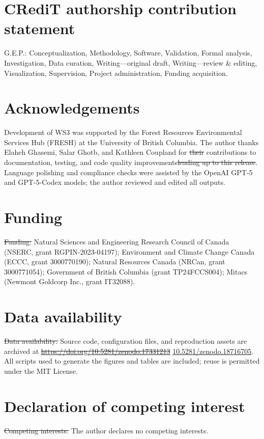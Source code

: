 \documentclass[review]{elsarticle}
\providecommand{\DIFaddtex}[1]{{\protect\color{blue}\uwave{#1}}} %
\providecommand{\DIFdeltex}[1]{{\protect\color{red}\sout{#1}}}                      %
\providecommand{\DIFaddbegin}{} %
\providecommand{\DIFaddend}{} %
\providecommand{\DIFdelbegin}{} %
\providecommand{\DIFdelend}{} %
\providecommand{\DIFadd}[1]{\texorpdfstring{\DIFaddtex{#1}}{#1}} %
\providecommand{\DIFdel}[1]{\texorpdfstring{\DIFdeltex{#1}}{}} %
\newcommand{\DIFscaledelfig}{0.5}
\newlength{\DIFdelgraphicswidth} %
\newlength{\DIFdelgraphicsheight} %
\newcommand{\DIFaddincludegraphics}[2][]{{\color{blue}\fbox{\DIFOincludegraphics[#1]{#2}}}} %
\newcommand{\DIFdelincludegraphics}[2][]{%
\sbox{\DIFdelgraphicsbox}{\DIFOincludegraphics[#1]{#2}}%
\settoboxwidth{\DIFdelgraphicswidth}{\DIFdelgraphicsbox} %
\settoboxtotalheight{\DIFdelgraphicsheight}{\DIFdelgraphicsbox} %
\scalebox{\DIFscaledelfig}{%
\parbox[b]{\DIFdelgraphicswidth}{\usebox{\DIFdelgraphicsbox}\\[-\baselineskip] \rule{\DIFdelgraphicswidth}{0em}}\llap{\resizebox{\DIFdelgraphicswidth}{\DIFdelgraphicsheight}{%
\setlength{\unitlength}{\DIFdelgraphicswidth}%
\begin{picture}(1,1)%
\thicklines\linethickness{2pt} %
{\color[rgb]{1,0,0}\put(0,0){\framebox(1,1){}}}%
{\color[rgb]{1,0,0}\put(0,0){\line( 1,1){1}}}%
{\color[rgb]{1,0,0}\put(0,1){\line(1,-1){1}}}%
\end{picture}%
}\hspace*{3pt}}} %
} %
\DeclareRobustCommand{\DIFaddbegin}{\DIFOaddbegin \let\includegraphics\DIFaddincludegraphics} %
\DeclareRobustCommand{\DIFaddend}{\DIFOaddend \let\includegraphics\DIFOincludegraphics} %
\DeclareRobustCommand{\DIFdelbegin}{\DIFOdelbegin \let\includegraphics\DIFdelincludegraphics} %
\DeclareRobustCommand{\DIFdelend}{\DIFOaddend \let\includegraphics\DIFOincludegraphics} %
\begin{document}
\section*{CRediT authorship contribution statement}
G.E.P.: Conceptualization, Methodology, Software, Validation, Formal analysis, Investigation, Data curation, Writing—original draft, Writing—review \& editing, Visualization, Supervision, Project administration, Funding acquisition.

\section*{Acknowledgements}
Development of WS3 was supported by the Forest Resources Environmental Services Hub (FRESH) at the University of British Columbia. The author thanks Elaheh Ghasemi, Salar Ghotb, and Kathleen Coupland for \DIFdelbegin \DIFdel{their }\DIFdelend contributions to documentation, testing, and code quality improvements\DIFdelbegin \DIFdel{leading up to this release}\DIFdelend . Language polishing and compliance checks were assisted by the OpenAI GPT-5 and GPT-5-Codex models; the author reviewed and edited all outputs.

\section*{Funding}
\DIFdelbegin \DIFdel{Funding: }\DIFdelend Natural Sciences and Engineering Research Council of Canada (NSERC, grant RGPIN-2023-04197); Environment and Climate Change Canada (ECCC, grant 3000770190); Natural Resources Canada (NRCan, grant 3000771054); Government of British Columbia (grant TP24FCCS004); Mitacs (Newmont Goldcorp Inc., grant IT32088).

\section*{Data availability}
\DIFdelbegin \DIFdel{Data availability: }\DIFdelend Source code, configuration files, and reproduction assets are archived at \DIFdelbegin \href{https://doi.org/10.5281/zenodo.17331213}{\DIFdel{https://doi.org/10.5281/zenodo.17331213}}%
\DIFdelend \DIFaddbegin \DIFadd{Zenodo (DOI: }\url{10.5281/zenodo.18716705}\DIFadd{)}\DIFaddend . All scripts used to generate the figures and tables are included; reuse is permitted under the MIT License.

\section*{Declaration of competing interest}
\DIFdelbegin \DIFdel{Competing interests: }\DIFdelend The author declares no competing interests.
\end{document}
